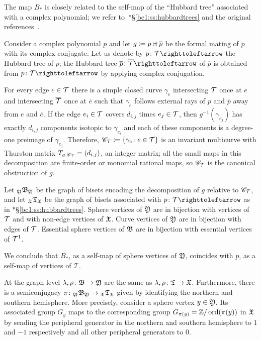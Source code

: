 \documentclass{amsart}
\begin{document}
\begin{exple}\label{exple:MattOFConjPolyn}
  The map $B_*$ is closely related to the self-map of the ``Hubbard
  tree'' associated with a complex polynomial; we refer
  to~\cite{bartholdi-dudko:bc1}*{\S\ref{bc1:ss:hubbardtrees}} and the
  original references~\cites{douady-h:edpc1,douady-h:edpc2}.

  Consider a complex polynomial $p$ and let
  $g\coloneqq p\uplus \overline p$ be the formal mating of $p$ with its
  complex conjugate. Let us denote by $p\colon \HT\selfmap$ the
  Hubbard tree of $p$; the Hubbard tree
  $\overline p\colon \overline \HT\selfmap $ of $\overline p$ is
  obtained from $p\colon \HT\selfmap$ by applying complex conjugation.

  For every edge $e\in {\mathcal T}$ there is a simple closed curve $\gamma_e$
  intersecting ${\mathcal T}$ once at $e$ and intersecting $\overline {{\mathcal T}}$ once
  at $\overline e$ such that $\gamma_e$ follows external rays of $p$
  and $\overline p$ away from $e$ and $\overline e$. If the edge
  $e_i\in {\mathcal T}$ covers $d_{i,j}$ times $e_j\in {\mathcal T}$, then
  $g^{-1}(\gamma_{e_j})$ has exactly $d_{i,j}$ components isotopic to
  $\gamma_{e_i}$ and each of these components is a degree-one preimage
  of $\gamma_{e_j}$. Therefore,
  ${\mathscr C}_{\mathcal T}\coloneqq \{\gamma_e\colon e\in {\mathcal T}\}$ is an invariant
  multicurve with Thurston matrix $T_{g,{\mathscr C}_{\mathcal T}}=(d_{i,j})$, an
  integer matrix; all the small maps in this decomposition are
  finite-order or monomial rational maps, so ${\mathscr C}_{\mathcal T}$ is the
  canonical obstruction of $g$.

  Let $\subscript\gfY\gfB_\gfY$ be the graph of
  bisets encoding the decomposition of $g$ relative to ${\mathscr C}_{\mathcal T}$, and
  let $\subscript\gf{\mathfrak T}_\gf$ be the graph of bisets associated
  with $p\colon \HT\selfmap$ as in
  \cite{bartholdi-dudko:bc1}*{\S\ref{bc1:ss:hubbardtrees}}. Sphere
  vertices of ${\mathfrak Y}$ are in bijection with vertices of ${\mathcal T}$
  and with non-edge vertices of ${\mathfrak X}$. Curve vertices of ${\mathfrak Y}$
  are in bijection with edges of ${\mathcal T}$. Essential sphere vertices of
  ${\mathfrak B}$ are in bijection with essential vertices of ${\mathcal T}^1$.

  We conclude that $B_*$, as a self-map of sphere vertices of ${\mathfrak Y}$,
  coincides with $p$, as a self-map of vertices of $\mathcal T$.

  At the graph level $\lambda,\rho \colon {\mathfrak B}\to {\mathfrak Y}$
  are the same as $\lambda,\rho \colon \mathfrak T\to
  {\mathfrak X}$. Furthermore, there is a semiconjugacy
  $\pi\colon \subscript\gfY\gfB_\gfY\to
  \subscript\gf{\mathfrak T}_\gf$ given by identifying the northern and
  southern hemisphere. More precisely, consider a sphere vertex
  $y\in{\mathfrak Y}$. Its associated group $G_y$ maps to the
  corresponding group $G_{\pi(y)}={\mathbb Z}/\operatorname{ord}(\pi(y))$ in ${\mathfrak X}$ by sending
  the peripheral generator in the northern and southern hemisphere to
  $1$ and $-1$ respectively and all other peripheral generators to
  $0$.

\end{exple}
\end{document}
